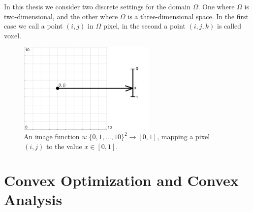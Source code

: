 \documentclass[abstracton]{scrreprt}
\begin{document}
        In this thesis we consider two discrete settings for the domain $\Omega$. One where $\Omega$ is two-dimensional, and the other where $\Omega$ is a three-dimensional space. In the first case we call a point $(i, j)$ in $\Omega$ pixel, in the second a point $(i, j, k)$ is called voxel.
        \begin{figure}[!ht]
            \centering
                \includegraphics[width=0.6\textwidth]{img/image_mapping.png}
            \caption[Mapping of images.]{An image function $u: \{0,1,...,10\}^{2} \to [0,1]$, mapping a pixel $(i,j)$ to the value $x \in [0,1]$.}
        \label{fig:image_mapping}
        \end{figure}
    \section{Convex Optimization and Convex Analysis} %
    \label{sec:convex_optimization_and_convex_analysis}
\end{document}
